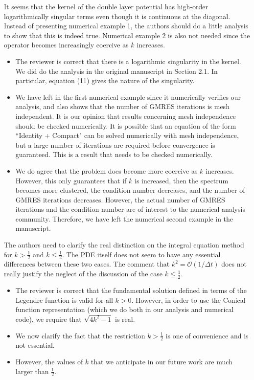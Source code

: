 \documentclass[11pt]{article}
\newcommand{\comment}[1]{{\color{blue} #1}}
\begin{document}
\comment{It seems that the kernel of the double layer potential has
high-order logarithmically singular terms even though it is continuous
at the diagonal. Instead of presenting numerical example 1, the authors
should do a little analysis to show that this is indeed true.
Numerical example 2 is also not needed since the operator becomes
increasingly coercive as $k$ increases.}
\begin{itemize}
  \item The reviewer is correct that there is a logarithmic singularity
  in the kernel.  We did do the analysis in the original manuscript in
  Section 2.1.  In particular, equation (11) gives the nature of the
  singularity.
  \item We have left in the first numerical example since it numerically
  verifies our analysis, and also shows that the number of GMRES
  iterations is mesh independent.  It is our opinion that results
  concerning mesh independence should be checked numerically.  It is
  possible that an equation of the form ``Identity + Compact" can be
  solved numerically with mesh independence, but a large number of
  iterations are required before convergence is guaranteed.  This is a
  result that needs to be checked numerically.
  \item We do agree that the problem does become more coercive as $k$
  increases.  However, this only guarantees that if $k$ is increased,
  then the spectrum becomes more clustered, the condition number
  decreases, and the number of GMRES iterations decreases.  However,
  the actual number of GMRES iterations and the condition number are of
  interest to the numerical analysis community.  Therefore, we have
  left the numerical second example in the manuscript.
\end{itemize}

\comment{The authors need to clarify the real distinction on the
integral equation method for $k > \frac{1}{2}$ and $k \leq
\frac{1}{2}$.  The PDE itself does not seem to have any essential
differences between these two cases. The comment that $k^{2} =
\mathcal{O}(1/\Delta t)$ does not really justify the neglect of the
discussion of the case $k\leq\frac{1}{2}.$}
\begin{itemize}
  \item The reviewer is correct that the fundamental solution defined in
  terms of the Legendre function is valid for all $k > 0$.  However, in
  order to use the Conical function representation (which we do both in
  our analysis and numerical code), we require that $\sqrt{4k^{2}-1}$ is
  real.
  \item We now clarify the fact that the restriction $k > \frac{1}{2}$
  is one of convenience and is not essential.
  \item However, the values of $k$ that we anticipate in our future work
  are much larger than $\frac{1}{2}$.
\end{itemize}
\end{document}
